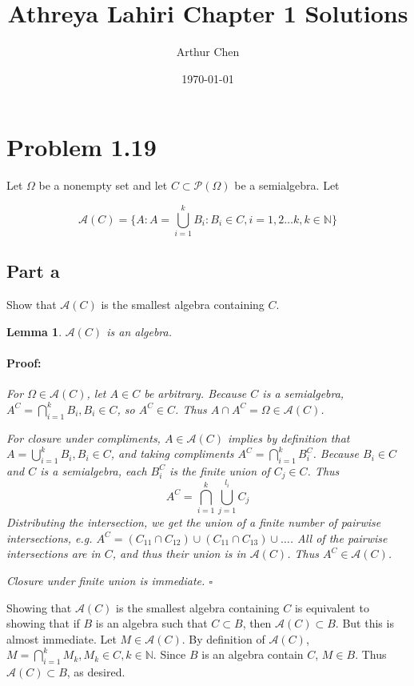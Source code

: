 \documentclass{article}
\author{Arthur Chen}
\title{Athreya Lahiri Chapter 1 Solutions}
\date{\today}
\newenvironment{proof}{\paragraph{Proof:}}{\hfill$\square$}
\newtheorem{lemma}[theorem]{Lemma}
\newcommand{\N}{\mathbb{N}}
\begin{document}
\maketitle

\section*{Problem 1.19}

Let $\Omega$ be a nonempty set and let $C \subset \mathcal{P} (\Omega)$ be a semialgebra. Let

\[
\mathcal{A}(C) = \{
A: A=\bigcup_{i=1}^k B_i:B_i \in C, i=1,2 \dots k, k\in \N
\}
\]

\subsection*{Part a}

Show that $\mathcal{A}(C)$ is the smallest algebra containing $C$.

\begin{lemma}
$\mathcal{A}(C)$ is an algebra.
\begin{proof}
For $\Omega \in \mathcal{A}(C)$, let $A\in C$ be arbitrary. Because $C$ is a semialgebra, $A^C = \bigcap_{i=1}^k B_i, B_i \in C$, so $A^C \in C$. Thus $A \cap A^C = \Omega \in \mathcal{A}(C)$.

For closure under compliments, $A \in \mathcal{A}(C)$ implies by definition that $A = \bigcup_{i=1}^k B_i, B_i \in C$, and taking compliments $A^C = \bigcap_{i=1}^k B_i^C$. Because $B_i \in C$ and $C$ is a semialgebra, each $B_i^C$ is the finite union of $C_j \in C$. Thus
\[
A^C = \bigcap_{i=1}^k\bigcup_{j=1}^{l_i}C_j
\]
Distributing the intersection, we get the union of a finite number of pairwise intersections, e.g. $A^C = (C_{11}\cap C_{12})\cup(C_{11}\cap C_{13})\cup \dots$. All of the pairwise intersections are in $C$, and thus their union is in $\mathcal{A}(C)$. Thus $A^C \in \mathcal{A}(C)$.

Closure under finite union is immediate. 
\end{proof}
\end{lemma}

Showing that $\mathcal{A}(C)$ is the smallest algebra containing $C$ is equivalent to showing that if $B$ is an algebra such that $C \subset B$, then $\mathcal{A}(C) \subset B$. But this is almost immediate. Let $M \in \mathcal{A}(C)$. By definition of $\mathcal{A}(C)$, $M = \bigcap_{i=1}^k M_k, M_k \in C, k \in \N$. Since $B$ is an algebra contain $C$, $M \in B$. Thus $\mathcal{A}(C) \subset B$, as desired.
\end{document}
